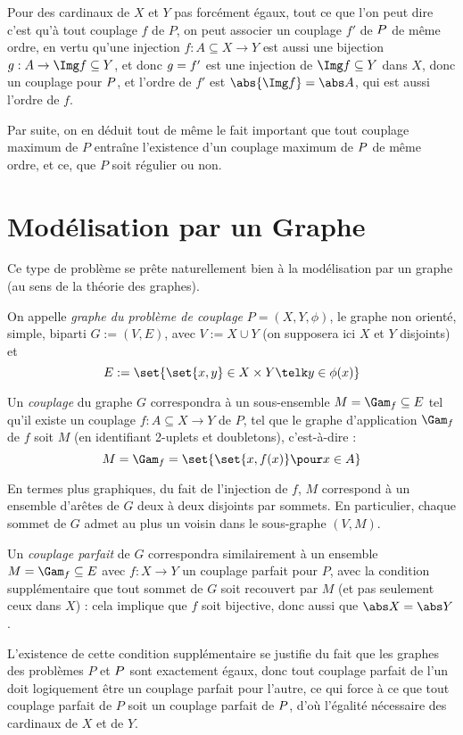  Pour des cardinaux de $X$ et $Y$ pas forcément égaux, tout ce que l'on peut dire c'est qu'à tout couplage $f$ de $P$, on peut associer un couplage $f'$ de $P\-$ de même ordre, en vertu qu'une injection $f : A \subseteq X \to Y$ est aussi une bijection $g : A \to \Img f \subseteq Y$, et donc $g\- = f'$ est une injection de $\Img f \subseteq Y$ dans $X$, donc un couplage pour $P\-$, et l'ordre de $f'$ est $\abs{\Img f} = \abs A$, qui est aussi l'ordre de $f$.
 
 Par suite, on en déduit tout de même le fait important que tout couplage maximum de $P$ entraîne l'existence d'un couplage maximum de $P\-$ de même ordre, et ce, que $P$ soit régulier ou non.
 
 \section{Modélisation par un Graphe}
 
 Ce type de problème se prête naturellement bien à la modélisation par un graphe (au sens de la théorie des graphes).
 
 \SEP\jdefi On appelle \emph{graphe du problème de couplage} $P = (X,Y,\phi)$, le graphe non orienté, simple, biparti $G := (V, E)$, avec $V := X \cup Y$ (on supposera ici $X$ et $Y$ disjoints) et
 \[ E := \set{ \set{x,y} \in X \times Y \telk y \in \phi(x) }\]
 
 Un \emph{couplage} du graphe $G$ correspondra à un sous-ensemble $M = \Gam_f \subseteq E$ tel qu'il existe un couplage $f : A \subseteq X \to Y$ de $P$, tel que le graphe d'application $\Gam_f$ de $f$ soit $M$ (en identifiant 2-uplets et doubletons), c'est-à-dire :
 \[ M = \Gam_f = \set{ \set{x,f(x)} \pour x \in A } \]
 
 En termes plus graphiques, du fait de l'injection de $f$, $M$ correspond à un ensemble d'arêtes de $G$ deux à deux disjoints par sommets. En particulier, chaque sommet de $G$ admet au plus un voisin dans le sous-graphe $(V, M)$.
 
 Un \emph{couplage parfait} de $G$ correspondra similairement à un ensemble $M = \Gam_f \subseteq E$ avec $f : X \to Y$ un couplage parfait pour $P$, avec la condition supplémentaire que tout sommet de $G$ soit recouvert par $M$ (et pas seulement ceux dans $X$) : cela implique que $f$ soit bijective, donc aussi que $\abs X = \abs Y$.
 
 L'existence de cette condition supplémentaire se justifie du fait que les graphes des problèmes $P$ et $P\-$ sont exactement égaux, donc tout couplage parfait de l'un doit logiquement être un couplage parfait pour l'autre, ce qui force à ce que tout couplage parfait de $P$ soit un couplage parfait de $P\-$, d'où l'égalité nécessaire des cardinaux de $X$ et de $Y$.
 
